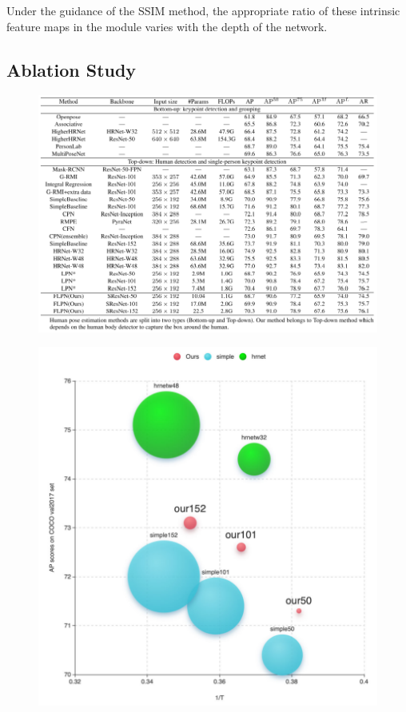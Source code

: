 \documentclass[11pt]{article}
\begin{document}
Under the guidance of the SSIM method, the appropriate ratio of these intrinsic feature maps in the module varies with the depth of the network.

\subsection{Ablation Study}
\begin{figure}[H]
	\centering
	\includegraphics[scale = 0.5]{83}
\end{figure}

\begin{figure}[H]
	\centering
	\includegraphics[scale = 0.7]{84}
\end{figure}
\end{document}
